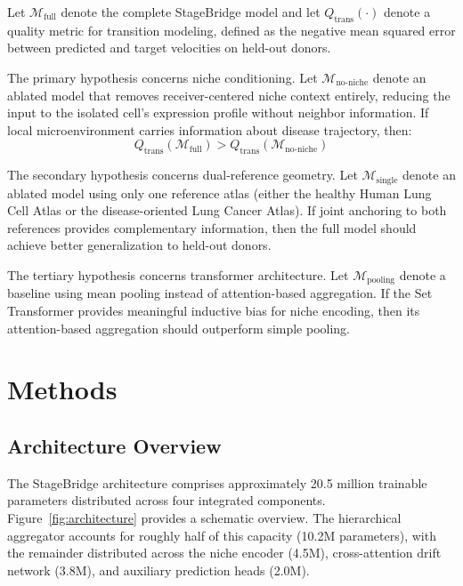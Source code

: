\documentclass[conference]{IEEEtran}
\begin{document}
Let $\mathcal{M}_{\text{full}}$ denote the complete StageBridge model and let $Q_{\text{trans}}(\cdot)$ denote a quality metric for transition modeling, defined as the negative mean squared error between predicted and target velocities on held-out donors.

The primary hypothesis concerns niche conditioning. Let $\mathcal{M}_{\text{no-niche}}$ denote an ablated model that removes receiver-centered niche context entirely, reducing the input to the isolated cell's expression profile without neighbor information. If local microenvironment carries information about disease trajectory, then:
\begin{equation}
Q_{\text{trans}}(\mathcal{M}_{\text{full}}) > Q_{\text{trans}}(\mathcal{M}_{\text{no-niche}})
\label{eq:h1}
\end{equation}

The secondary hypothesis concerns dual-reference geometry. Let $\mathcal{M}_{\text{single}}$ denote an ablated model using only one reference atlas (either the healthy Human Lung Cell Atlas or the disease-oriented Lung Cancer Atlas). If joint anchoring to both references provides complementary information, then the full model should achieve better generalization to held-out donors.

The tertiary hypothesis concerns transformer architecture. Let $\mathcal{M}_{\text{pooling}}$ denote a baseline using mean pooling instead of attention-based aggregation. If the Set Transformer provides meaningful inductive bias for niche encoding, then its attention-based aggregation should outperform simple pooling.

\section{Methods}

\subsection{Architecture Overview}

The StageBridge architecture comprises approximately 20.5 million trainable parameters distributed across four integrated components. Figure~\ref{fig:architecture} provides a schematic overview. The hierarchical aggregator accounts for roughly half of this capacity (10.2M parameters), with the remainder distributed across the niche encoder (4.5M), cross-attention drift network (3.8M), and auxiliary prediction heads (2.0M).
\end{document}
